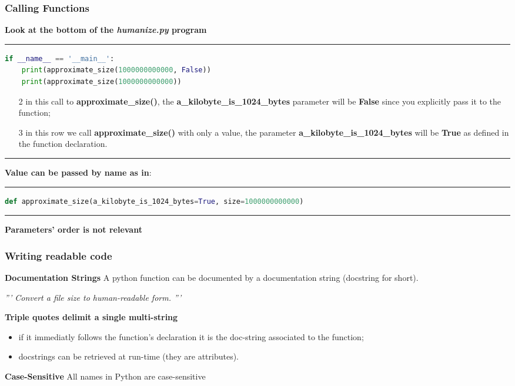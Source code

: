 \subsubsection{Calling Functions}
\textbf{Look at the bottom of the \textit{humanize.py} program}
\hrule
\begin{lstlisting}[language=Python]
if __name__ == '__main__':
	print(approximate_size(1000000000000, False))
	print(approximate_size(1000000000000))
\end{lstlisting}
\begin{enumerate}
	\item[2] in this call to \textbf{approximate\_size()}, the \textbf{a\_kilobyte\_is\_1024\_bytes} parameter will be \textbf{False} since you explicitly pass it to the function;
	\item[3] in this row we call  \textbf{approximate\_size()} with only a value, the parameter \textbf{a\_kilobyte\_is\_1024\_bytes} will be \textbf{True} as defined in the function declaration.
\end{enumerate}
\hrule
\textbf{Value can be passed by name as in}:
\hrule
\begin{lstlisting}[language=Python]
def approximate_size(a_kilobyte_is_1024_bytes=True, size=1000000000000)
\end{lstlisting}	
\hrule
\textbf{Parameters' order is not relevant}

\subsubsection{Writing readable code}
\textbf{Documentation Strings}
A python function can be documented by a documentation string (docstring for short).
\begin{center}
	\textit{''' Convert a file size to human-readable form.  '''}
\end{center}
\textbf{Triple quotes delimit a single multi-string}
\begin{itemize}
	\item if it immediatly follows the function's declaration it is the doc-string associated to the function;
	\item docstrings can be retrieved at run-time (they are attributes).
\end{itemize}
\textbf{Case-Sensitive}
All names in Python are case-sensitive

